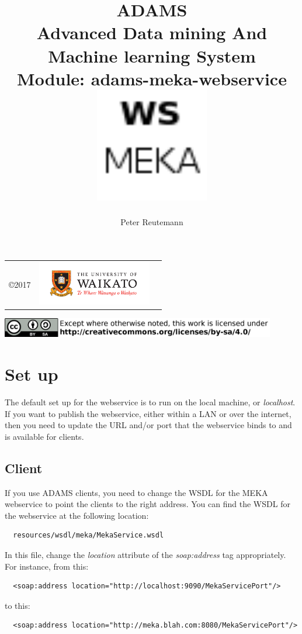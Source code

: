 \documentclass[a4paper]{book}
\title{
  \textbf{ADAMS} \\
  {\Large \textbf{A}dvanced \textbf{D}ata mining \textbf{A}nd \textbf{M}achine
  learning \textbf{S}ystem} \\
  {\Large Module: adams-meka-webservice} \\
  \vspace{1cm}
  \includegraphics[width=5cm]{images/meka-webservice-module.png} \\
}
\author{
  Peter Reutemann
}
\begin{document}
\begin{titlepage}
\maketitle

\thispagestyle{empty}
\center
\begin{table}[b]
	\begin{tabular}{c l l}
		\parbox[c][2cm]{2cm}{\copyright 2017} &
		\parbox[c][2cm]{5cm}{\includegraphics[width=5cm]{images/coat_of_arms.pdf}}
	\end{tabular}
	\includegraphics[width=12cm]{images/cc.png} \\
\end{table}

\end{titlepage}

\tableofcontents
\listoffigures

\chapter{Set up}
The default set up for the webservice is to run on the local machine, or
\textit{localhost}. If you want to publish the webservice, either within
a LAN or over the internet, then you need to update the URL and/or port that the 
webservice binds to and is available for clients.

\section{Client}
If you use ADAMS clients, you need to change the WSDL for the MEKA webservice
to point the clients to the right address. You can find the WSDL for the 
webservice at the following location:
\begin{verbatim}
  resources/wsdl/meka/MekaService.wsdl
\end{verbatim}
In this file, change the \textit{location} attribute of the \textit{soap:address} 
tag appropriately. For instance, from this:\
\begin{verbatim}
  <soap:address location="http://localhost:9090/MekaServicePort"/>
\end{verbatim}
to this:
\begin{verbatim}
  <soap:address location="http://meka.blah.com:8080/MekaServicePort"/>
\end{verbatim}
\end{document}
